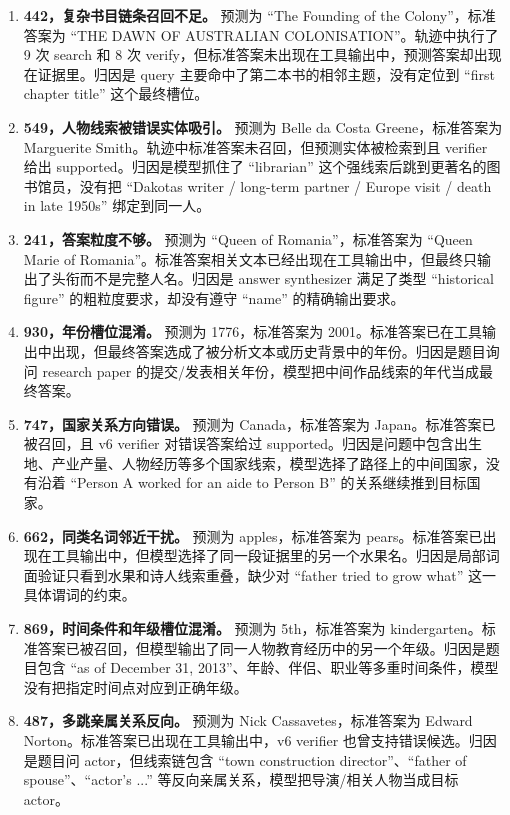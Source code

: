 \documentclass[a4paper]{article}
\begin{document}
\begin{enumerate}
  \item \textbf{442，复杂书目链条召回不足。} 预测为 ``The Founding of the Colony''，标准答案为 ``THE DAWN OF AUSTRALIAN COLONISATION''。轨迹中执行了 9 次 search 和 8 次 verify，但标准答案未出现在工具输出中，预测答案却出现在证据里。归因是 query 主要命中了第二本书的相邻主题，没有定位到 ``first chapter title'' 这个最终槽位。
  \item \textbf{549，人物线索被错误实体吸引。} 预测为 Belle da Costa Greene，标准答案为 Marguerite Smith。轨迹中标准答案未召回，但预测实体被检索到且 verifier 给出 supported。归因是模型抓住了 ``librarian'' 这个强线索后跳到更著名的图书馆员，没有把 ``Dakotas writer / long-term partner / Europe visit / death in late 1950s'' 绑定到同一人。
  \item \textbf{241，答案粒度不够。} 预测为 ``Queen of Romania''，标准答案为 ``Queen Marie of Romania''。标准答案相关文本已经出现在工具输出中，但最终只输出了头衔而不是完整人名。归因是 answer synthesizer 满足了类型 ``historical figure'' 的粗粒度要求，却没有遵守 ``name'' 的精确输出要求。
  \item \textbf{930，年份槽位混淆。} 预测为 1776，标准答案为 2001。标准答案已在工具输出中出现，但最终答案选成了被分析文本或历史背景中的年份。归因是题目询问 research paper 的提交/发表相关年份，模型把中间作品线索的年代当成最终答案。
  \item \textbf{747，国家关系方向错误。} 预测为 Canada，标准答案为 Japan。标准答案已被召回，且 v6 verifier 对错误答案给过 supported。归因是问题中包含出生地、产业产量、人物经历等多个国家线索，模型选择了路径上的中间国家，没有沿着 ``Person A worked for an aide to Person B'' 的关系继续推到目标国家。
  \item \textbf{662，同类名词邻近干扰。} 预测为 apples，标准答案为 pears。标准答案已出现在工具输出中，但模型选择了同一段证据里的另一个水果名。归因是局部词面验证只看到水果和诗人线索重叠，缺少对 ``father tried to grow what'' 这一具体谓词的约束。
  \item \textbf{869，时间条件和年级槽位混淆。} 预测为 5th，标准答案为 kindergarten。标准答案已被召回，但模型输出了同一人物教育经历中的另一个年级。归因是题目包含 ``as of December 31, 2013''、年龄、伴侣、职业等多重时间条件，模型没有把指定时间点对应到正确年级。
  \item \textbf{487，多跳亲属关系反向。} 预测为 Nick Cassavetes，标准答案为 Edward Norton。标准答案已出现在工具输出中，v6 verifier 也曾支持错误候选。归因是题目问 actor，但线索链包含 ``town construction director''、``father of spouse''、``actor's ...'' 等反向亲属关系，模型把导演/相关人物当成目标 actor。

\end{enumerate}
\end{document}
